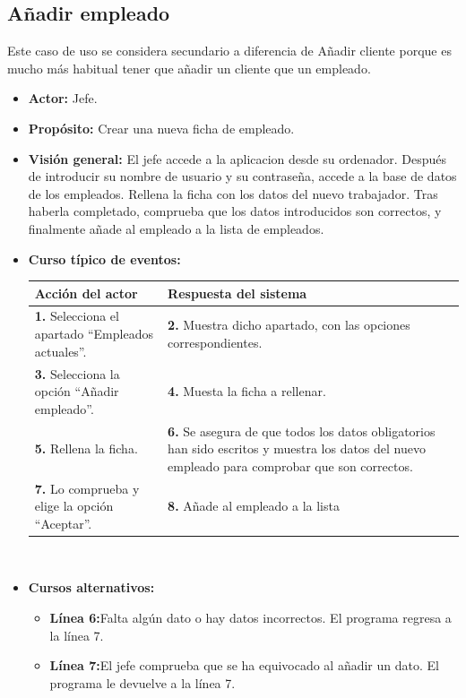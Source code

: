 \documentclass[spanish,a4paper,11pt, twoside]{report}	%
\begin{document}

	\subsection{Añadir empleado}	
	Este caso de uso se considera secundario a diferencia de Añadir cliente porque es mucho más habitual tener que añadir un cliente que un empleado.
			\begin{itemize}
			\item \textbf{Actor:} Jefe.
			\item \textbf{Propósito:} Crear una nueva ficha de empleado.
			\item \textbf{Visión general:} El jefe accede a la aplicacion desde su
				ordenador. Después de introducir su nombre de usuario y su contraseña, accede a
				la base de datos de los empleados. Rellena la ficha con los datos del nuevo
				trabajador. Tras haberla completado, comprueba que los datos introducidos son
				correctos, y finalmente añade al empleado a la lista de empleados.
			\item \textbf{Curso típico de eventos:} 	\\
				\begin{tabular}{|p{6cm}||p{6cm}|}
				\hline
				\textbf{Acción del actor} & \textbf{Respuesta del sistema} \\ \hline \hline
				\textbf{1.} Selecciona el apartado ``Empleados actuales''. & 
				\textbf{2.} Muestra dicho apartado, con las opciones correspondientes. \\ \hline
				\textbf{3.} Selecciona la opción ``Añadir empleado''.	& 
				\textbf{4.} Muesta la ficha a rellenar. \\ \hline
				\textbf{5.} Rellena la ficha. & 
				\textbf{6.} Se asegura de que todos los datos obligatorios han sido escritos y
					muestra los datos del nuevo empleado para comprobar que son correctos.\\ \hline
				\textbf{7.} Lo comprueba y elige la opción ``Aceptar''. & 
				\textbf{8. }Añade al empleado a la lista \\ \hline
			\end{tabular}
			\\
			\item \textbf{Cursos alternativos:} 
			\begin{itemize}
			\item  \textbf{Línea 6:}Falta algún dato o hay datos incorrectos. El programa regresa a la línea 7.
			\item  \textbf{Línea 7:}El jefe comprueba que se ha equivocado al añadir un dato. 
				El programa le devuelve a la línea 7.
			\end {itemize}
		\end{itemize}
\end{document}
